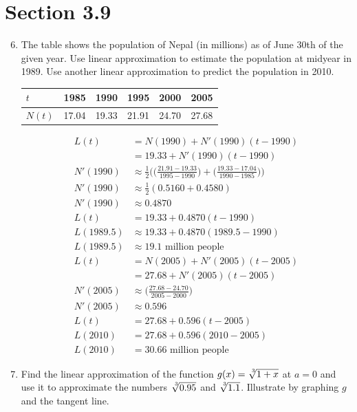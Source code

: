 \documentclass{article}
\begin{document}
\section{Section 3.9}
\begin{enumerate}
\setcounter{enumi}{5}
	\item The table shows the population of Nepal (in millions) as of June 30th of the given year. Use linear approximation to estimate the population at midyear in 1989. Use another linear approximation to predict the population in 2010.
	\begin{center}
		\begin{tabular}{|l|l|l|l|l|l|}\hline
		$t$    & 1985  & 1990  & 1995  & 2000  & 2005  \\ \hline
		$N(t)$ & 17.04 & 19.33 & 21.91 & 24.70 & 27.68 \\ \hline
		\end{tabular}
	\end{center}
	$$\begin{align}
		L(t)&=N(1990)+N'(1990)(t-1990)\\
		&=19.33+N'(1990)(t-1990)\\
		N'(1990)&\approx\frac{1}{2}\Bigg(\Big(\frac{21.91-19.33}{1995-1990} \Big)+\Big(\frac{19.33-17.04}{1990-1985} \Big)\Bigg)\\
		N'(1990)&\approx \frac{1}{2}(0.5160+0.4580)\\
		N'(1990)&\approx 0.4870\\
		L(t)&=19.33+0.4870(t-1990)\\
		L(1989.5)&\approx 19.33+0.4870(1989.5-1990)\\
		L(1989.5)&\approx \boxed{19.1 \text{ million people}}\\ \hline
		L(t)&=N(2005)+N'(2005)(t-2005)\\
		&=27.68+N'(2005)(t-2005)\\
		N'(2005)&\approx\Big(\frac{27.68-24.70}{2005-2000} \Big)\\
		N'(2005)&\approx 0.596\\
		L(t)&=27.68+0.596(t-2005)\\
		L(2010)&=27.68+0.596(2010-2005)\\
		L(2010)&=\boxed{30.66 \text{ million people}}
	\end{align}$$
\setcounter{enumi}{9}
	\item Find the linear approximation of the function $g(x)=\sqrt[\leftroot{-2}\uproot{2}3]{1+x}$ at $a=0$ and use it to approximate the numbers $\sqrt[\leftroot{-2}\uproot{2}3]{0.95}$ and $\sqrt[\leftroot{-2}\uproot{2}3]{1.1}$. Illustrate by graphing $g$ and the tangent line.

\end{enumerate}
\end{document}
